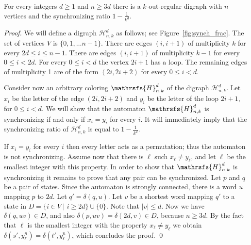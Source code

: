 \documentclass[runningheads]{llncs}
\begin{document}
\begin{theorem}
For every integers $d \geq 1$ and $n \ge 3d$ there is a $k$-out-regular digraph with $n$ vertices and the synchronizing ratio $1-\frac{1}{k^d}$.
\end{theorem}
\begin{proof}
We will define a digraph $\mathcal{H}^d_{n,k}$ as follows; see Figure~\ref{fig:synch_frac}. The set of vertices $V$ is $\{0,1, \ldots n-1\}$. There are edges $(i,i+1)$ of multiplicity $k$ for every $2d \leq i \leq n-1$. There are edges $(i,i+1)$ of multiplicity $k-1$ for every $0 \leq i < 2d$.
For every $0 \leq i < d$ the vertex $2i+1$ has a loop.
The remaining edges of multiplicity 1 are of the form $(2i, 2i+2)$ for every $0 \leq i < d$.

Consider now an arbitrary coloring $\mathrsfs{H}^d_{n,k}$ of the digraph $\mathcal{H}^d_{n,k}$.
Let $x_i$ be the letter of the edge $(2i, 2i+2)$ and $y_i$ be the letter of the loop $2i+1$, for $0 \leq i < d$.
We will show that the automaton $\mathrsfs{H}^d_{n,k}$ is synchronizing if and only if $x_i = y_i$ for every $i$.
It will immediately imply that the synchronizing ratio of $\mathcal{H}^d_{n,k}$ is equal to $1-\frac{1}{k^d}$.

If $x_i=y_i$ for every $i$ then every letter acts as a permutation; thus the automaton is not synchronizing.
Assume now that there is $\ell$ such $x_\ell \neq y_\ell$, and let $\ell$ be the smallest integer with this property.
In order to show that $\mathrsfs{H}^d_{n,k}$ is synchronizing it remains to prove that any pair can be synchronized. Let $p$ and $q$ be a pair of states. Since the automaton is strongly connected, there is a word $u$ mapping $p$ to $2d$. Let $q' = \delta(q,u)$.
Let $v$ be a shortest word mapping $q'$ to a state in $D=\{i \in V \mid i\geq 2d\} \cup \{0\}$. Note that $|v| \le d$.
Now we have $\delta(q,uv) \in D$, and also $\delta(p,uv) = \delta(2d,v) \in D$, because $n \ge 3d$.
By the fact that $\ell$ is the smallest integer with the property $x_\ell \neq y_\ell$ we obtain $\delta(s',y^n_\ell) = \delta(t',y^n_\ell)$, which concludes the proof.
\qed
\end{proof}
\end{document}

